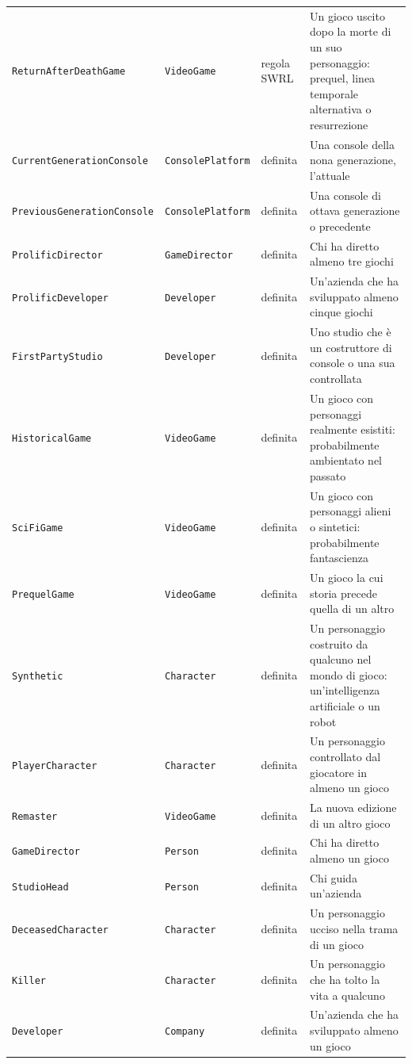 \begin{longtable}{lllp{5.8cm}}
\texttt{ReturnAfterDeathGame} & \texttt{VideoGame} & regola SWRL & Un gioco uscito dopo la morte di un suo personaggio: prequel, linea temporale alternativa o resurrezione \\
\texttt{CurrentGenerationConsole} & \texttt{ConsolePlatform} & definita & Una console della nona generazione, l'attuale \\
\texttt{PreviousGenerationConsole} & \texttt{ConsolePlatform} & definita & Una console di ottava generazione o precedente \\
\texttt{ProlificDirector} & \texttt{GameDirector} & definita & Chi ha diretto almeno tre giochi \\
\texttt{ProlificDeveloper} & \texttt{Developer} & definita & Un'azienda che ha sviluppato almeno cinque giochi \\
\texttt{FirstPartyStudio} & \texttt{Developer} & definita & Uno studio che è un costruttore di console o una sua controllata \\
\texttt{HistoricalGame} & \texttt{VideoGame} & definita & Un gioco con personaggi realmente esistiti: probabilmente ambientato nel passato \\
\texttt{SciFiGame} & \texttt{VideoGame} & definita & Un gioco con personaggi alieni o sintetici: probabilmente fantascienza \\
\texttt{PrequelGame} & \texttt{VideoGame} & definita & Un gioco la cui storia precede quella di un altro \\
\texttt{Synthetic} & \texttt{Character} & definita & Un personaggio costruito da qualcuno nel mondo di gioco: un'intelligenza artificiale o un robot \\
\texttt{PlayerCharacter} & \texttt{Character} & definita & Un personaggio controllato dal giocatore in almeno un gioco \\
\texttt{Remaster} & \texttt{VideoGame} & definita & La nuova edizione di un altro gioco \\
\texttt{GameDirector} & \texttt{Person} & definita & Chi ha diretto almeno un gioco \\
\texttt{StudioHead} & \texttt{Person} & definita & Chi guida un'azienda \\
\texttt{DeceasedCharacter} & \texttt{Character} & definita & Un personaggio ucciso nella trama di un gioco \\
\texttt{Killer} & \texttt{Character} & definita & Un personaggio che ha tolto la vita a qualcuno \\
\texttt{Developer} & \texttt{Company} & definita & Un'azienda che ha sviluppato almeno un gioco \\

\end{longtable}
